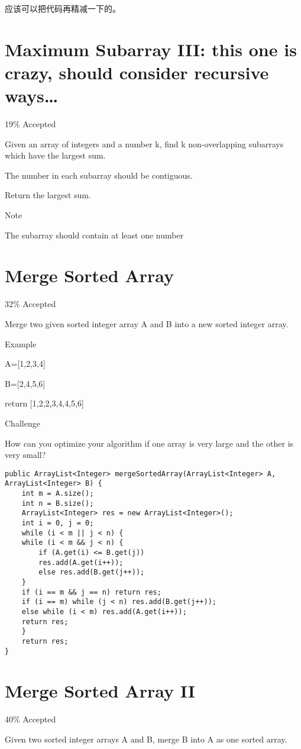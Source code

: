 \documentclass[12pt]{book}
\begin{document}
应该可以把代码再精减一下的。
\chapter{Maximum Subarray III: this one is crazy, should consider recursive ways\ldots{}}
\label{sec-40}

19\% Accepted

Given an array of integers and a number k, find k non-overlapping subarrays which have the largest sum.

The number in each subarray should be contiguous.

Return the largest sum.

Note

The subarray should contain at least one number
\chapter{Merge Sorted Array}
\label{sec-41}

32\% Accepted

Merge two given sorted integer array A and B into a new sorted integer array.

Example

A=[1,2,3,4]

B=[2,4,5,6]

return [1,2,2,3,4,4,5,6]

Challenge

How can you optimize your algorithm if one array is very large and the other is very small?
\lstset{language=java,label= ,caption= ,numbers=none}
\begin{lstlisting}
public ArrayList<Integer> mergeSortedArray(ArrayList<Integer> A, ArrayList<Integer> B) {
    int m = A.size();
    int n = B.size();
    ArrayList<Integer> res = new ArrayList<Integer>();
    int i = 0, j = 0;
    while (i < m || j < n) {
	while (i < m && j < n) {
	    if (A.get(i) <= B.get(j)) 
		res.add(A.get(i++));
	    else res.add(B.get(j++));
	}
	if (i == m && j == n) return res;
	if (i == m) while (j < n) res.add(B.get(j++));
	else while (i < m) res.add(A.get(i++));
	return res;
    }
    return res;
}
\end{lstlisting}
\chapter{Merge Sorted Array II}
\label{sec-42}

40\% Accepted

Given two sorted integer arrays A and B, merge B into A as one sorted array.
\end{document}
